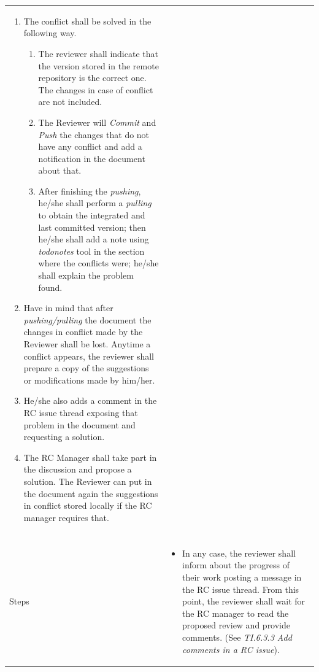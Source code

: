 \documentclass{template/openetcs_article}
\begin{document}
\begin{flushleft}
\begin{supertabular}{|m{2cm}|m{13cm}|}
\begin{itemize}
\begin{itemize}
\begin{enumerate}
\item The conflict shall be solved in the following way.
\begin{enumerate}
\item The reviewer shall indicate that the version stored in the remote repository is the correct one. The changes in case of conflict are not included. 
\item The Reviewer will {\it Commit} and {\it Push} the changes that do not have any conflict and add a notification in the document about that. 
\item After finishing the {\it pushing}, he/she shall perform a {\it pulling} to obtain the integrated and last committed version; then he/she shall add a note using {\it todonotes} tool in the section where the conflicts were; he/she shall explain the problem found. 
\end{enumerate}
\item Have in mind that after {\it pushing/pulling} the document the changes in conflict made by the Reviewer shall be lost. Anytime a conflict appears, the reviewer shall prepare a copy of the suggestions or modifications made by him/her.
\item He/she also adds a comment in the RC issue thread exposing that problem in the document and requesting a solution.
\item The RC Manager shall take part in the discussion and propose a solution. The Reviewer can put in the document again the suggestions in conflict stored locally if the RC manager requires that.
\end{enumerate}
\end{itemize}
\end{itemize}
\\\\\hline
Steps &
\begin{itemize}
\item In any case, the reviewer shall inform about the progress of their work posting a message in the RC issue thread. From this point, the reviewer shall wait for the RC manager to read the proposed review and provide comments. (See {\it TI.6.3.3 Add comments in a RC issue}).
\end{itemize}
\\\hline
\end{supertabular}
\end{flushleft}
\end{document}
